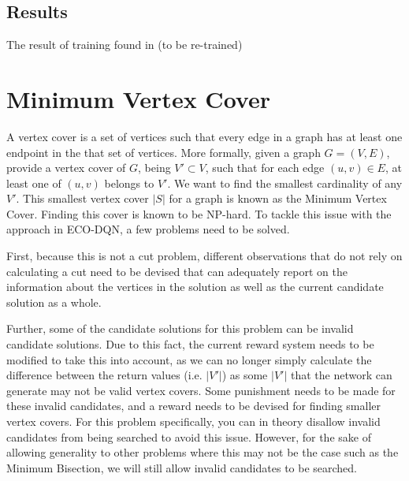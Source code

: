 \documentclass{article}
\begin{document}
\subsection{Results}\label{sec:results-min-cut}

The result of training found in (to be re-trained) %


\section{Minimum Vertex Cover}\label{sec:mvc}

A vertex cover is a set of vertices such that every edge in a graph has at least one endpoint in the that set of vertices. More formally, given a graph $G = (V, E)$, provide a vertex cover of $G$, being $V' \subset V$, such that for each edge $(u, v) \in E$, at least one of $(u, v)$ belongs to $V'$. We want to find the smallest cardinality of any $V'$. This smallest vertex cover $|S|$ for a graph is known as the Minimum Vertex Cover. Finding this cover is known to be NP-hard. To tackle this issue with the approach in ECO-DQN, a few problems need to be solved.

First, because this is not a cut problem, different observations that do not rely on calculating a cut need to be devised that can adequately report on the information about the vertices in the solution as well as the current candidate solution as a whole. 

Further, some of the candidate solutions for this problem can be invalid candidate solutions. Due to this fact, the current reward system needs to be modified to take this into account, as we can no longer simply calculate the difference between the return values (i.e. $|V'|$) as some $|V'|$ that the network can generate may not be valid vertex covers. Some punishment needs to be made for these invalid candidates, and a reward needs to be devised for finding smaller vertex covers. For this problem specifically, you can in theory disallow invalid candidates from being searched to avoid this issue. However, for the sake of allowing generality to other problems where this may not be the case such as the Minimum Bisection, we will still allow invalid candidates to be searched. 
\end{document}
